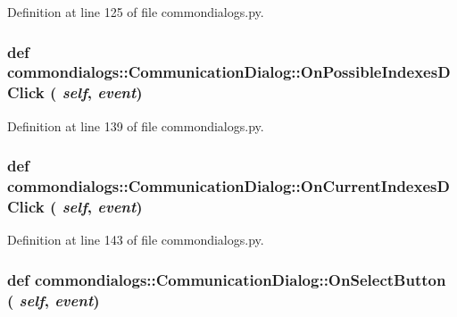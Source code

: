 Definition at line 125 of file commondialogs.py.\hypertarget{classcommondialogs_1_1CommunicationDialog_e82c18258dbad9910746289959b51907}{
\subsubsection[OnPossibleIndexesDClick]{\setlength{\rightskip}{0pt plus 5cm}def commondialogs::Communication\-Dialog::On\-Possible\-Indexes\-DClick ( {\em self},  {\em event})}}
\label{classcommondialogs_1_1CommunicationDialog_e82c18258dbad9910746289959b51907}




Definition at line 139 of file commondialogs.py.\hypertarget{classcommondialogs_1_1CommunicationDialog_3ba145fc2f75f642c56795886f42662e}{
\subsubsection[OnCurrentIndexesDClick]{\setlength{\rightskip}{0pt plus 5cm}def commondialogs::Communication\-Dialog::On\-Current\-Indexes\-DClick ( {\em self},  {\em event})}}
\label{classcommondialogs_1_1CommunicationDialog_3ba145fc2f75f642c56795886f42662e}




Definition at line 143 of file commondialogs.py.\hypertarget{classcommondialogs_1_1CommunicationDialog_46ef8786e87def46043ea11cfd74a279}{
\subsubsection[OnSelectButton]{\setlength{\rightskip}{0pt plus 5cm}def commondialogs::Communication\-Dialog::On\-Select\-Button ( {\em self},  {\em event})}}
\label{classcommondialogs_1_1CommunicationDialog_46ef8786e87def46043ea11cfd74a279}




